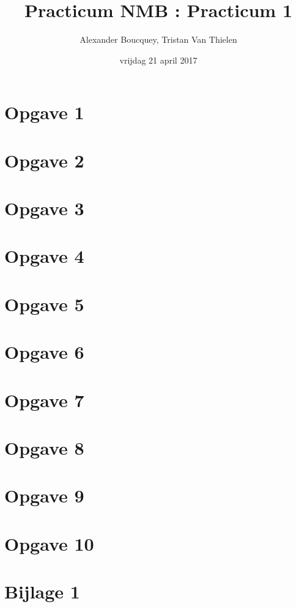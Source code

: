 \documentclass[a4paper]{article}
\title{Practicum NMB : Practicum 1}
\author{Alexander Boucquey, Tristan Van Thielen}
\date{vrijdag 21 april 2017}
\newcommand{\opgave}[1]{\section*{Opgave #1}}
\begin{document}
\maketitle

\opgave{1}


\clearpage

\opgave{2}


\begin{flushleft}

\opgave{3}


\opgave{4}


\opgave{5}


\opgave{6}


\opgave{7}


\opgave{8}


\opgave{9}


\opgave{10}


\clearpage
\section*{Bijlage 1}





\end{flushleft}
\end{document}
